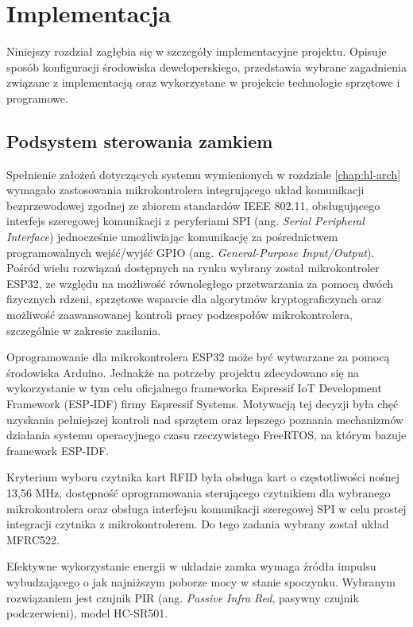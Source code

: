 \chapter{Implementacja}
\label{chap:implementation}

    Niniejszy rozdział zagłębia się w szczegóły implementacyjne projektu. Opisuje sposób konfiguracji środowiska deweloperskiego, przedstawia wybrane zagadnienia związane z implementacją oraz wykorzystane w projekcie technologie sprzętowe i programowe.

    \section{Podsystem sterowania zamkiem}

        Spełnienie założeń dotyczących systemu wymienionych w rozdziale \ref{chap:hl-arch} wymagało zastosowania mikrokontrolera integrującego układ komunikacji bezprzewodowej zgodnej ze zbiorem standardów IEEE 802.11, obsługującego interfejs szeregowej komunikacji z peryferiami SPI (ang. \textit{Serial Peripheral Interface}) jednocześnie umożliwiając komunikację za pośrednictwem programowalnych wejść/wyjść GPIO (ang. \textit{General-Purpose Input/Output}). Pośród wielu rozwiązań dostępnych na rynku wybrany został mikrokontroler ESP32, ze względu na możliwość równoległego przetwarzania za pomocą dwóch fizycznych rdzeni, sprzętowe wsparcie dla algorytmów kryptograficzynch oraz możliwość zaawansowanej kontroli pracy podzespołów mikrokontrolera, szczególnie w zakresie zasilania.

        Oprogramowanie dla mikrokontrolera ESP32 może być wytwarzane za pomocą środowiska Arduino. Jednakże na potrzeby projektu zdecydowano się na wykorzystanie w tym celu oficjalnego frameworka Espressif IoT Development Framework (ESP-IDF) firmy Espressif Systems. Motywacją tej decyzji była chęć uzyskania pełniejszej kontroli nad sprzętem oraz lepszego poznania mechanizmów działania systemu operacyjnego czasu rzeczywistego FreeRTOS, na którym bazuje framework ESP-IDF.

        Kryterium wyboru czytnika kart RFID była obsługa kart o częstotliwości nośnej 13,56 MHz, dostępność oprogramowania sterującego czytnikiem dla wybranego mikrokontrolera oraz obsługa interfejsu komunikacji szeregowej SPI w celu prostej integracji czytnika z mikrokontrolerem. Do tego zadania wybrany został układ MFRC522.

        Efektywne wykorzystanie energii w układzie zamka wymaga źródła impulsu wybudzającego o jak najniższym poborze mocy w stanie spoczynku. Wybranym rozwiązaniem jest czujnik PIR (ang. \textit{Passive Infra Red}, pasywny czujnik podczerwieni), model HC-SR501.

